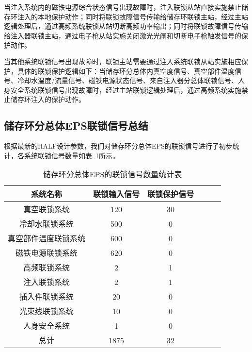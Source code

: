 当注入系统内的磁铁电源综合状态信号出现故障时，注入联锁从站直接实施禁止储存环注入的本地保护动作；同时将联锁故障信号传输给储存环联锁主站，经过主站逻辑处理后，通过高频系统联锁从站切断高频功率输出；同时将联锁故障信号传输给注入器联锁主站，通过电子枪从站实施关闭激光光闸和切断电子枪触发信号的保护动作。

当其他系统联锁信号出现故障时，联锁主站需要通过注入系统联锁从站实施相应保护，具体的联锁保护逻辑如下：当储存环分总体内真空度信号、真空部件温度信号、冷却水温度/流量信号、磁铁电源状态信号、来自注入器分总体联锁信号、人身安全系统联锁信号出现故障时，经过主站联锁逻辑处理后，通过高频系统实施禁止储存环注入的保护动作。

\subsection{储存环分总体EPS联锁信号总结}

根据最新的HALF设计参数，我们对储存环分总体EPS的联锁信号进行了初步统计，各系统联锁信号数量如表~\ref{table:4.3}所示。

\begin{table}[!hbt]
  \centering
  \caption{储存环分总体EPS的联锁信号数量统计表}
  \label{table:4.3} 
  \begin{center}
  \begin{tabular}{cccccc}
    \toprule

     系统名称&联锁输入信号&联锁保护信号\\
    \midrule
    真空联锁系统& 120 & 30 \\

    冷却水联锁系统  &500& 0\\
    
    真空部件温度联锁系统  & 600 & 0 \\
    
    磁铁电源联锁系统 &620 & 0\\
    
    高频联锁系统 &2 &1 \\
    
    注入联锁系统  &2& 1\\

    插入件联锁系统 & 20& 0\\

    光束线联锁系统 & 10& 0\\
    
    人身安全系统& 1& 0\\

    总计&1875& 32\\

    \bottomrule
  \end{tabular}
\end{center}
\end{table}

